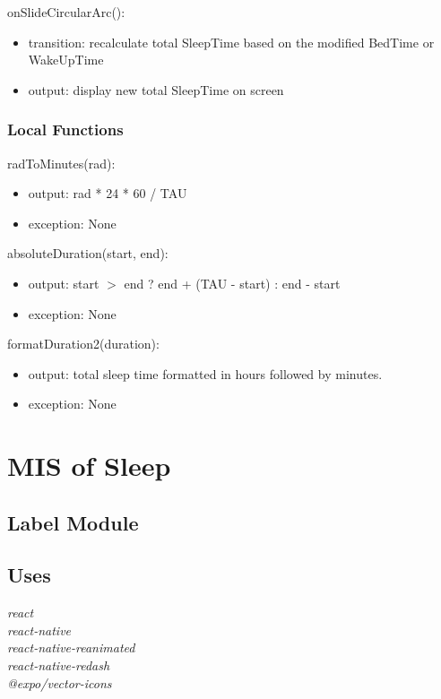 \documentclass[12pt, titlepage]{article}
\begin{document}
\noindent onSlideCircularArc():
\begin{itemize}
	\item transition: recalculate total SleepTime based on the modified BedTime or WakeUpTime
	\item output: display new total SleepTime on screen
\end{itemize}

\subsubsection{Local Functions}

\noindent radToMinutes(rad):
\begin{itemize}
	\item output: rad * 24 * 60 / TAU
	\item exception: None 
\end{itemize}

\noindent absoluteDuration(start, end):
\begin{itemize}
	\item output: start $>$ end ? end + (TAU - start) : end - start  
	\item exception: None 
\end{itemize}

\noindent formatDuration2(duration):
\begin{itemize}
	\item output: total sleep time formatted in hours followed by minutes.
	\item exception: None 
\end{itemize}

\section{MIS of Sleep} \label{Module} 

\subsection{Label Module}

\subsection{Uses}
{\textit{react}}\\
{\textit{react-native}}\\
{\textit{react-native-reanimated}}\\
{\textit{react-native-redash}}\\
{\textit{@expo/vector-icons}}
\end{document}
